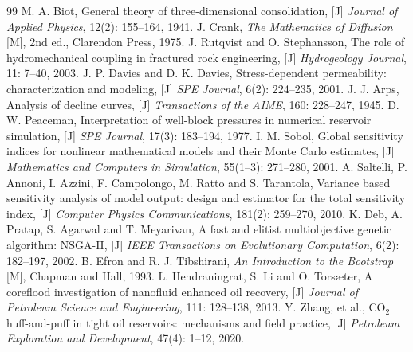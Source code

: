 \documentclass{swmcmthesis}
\begin{document}
\begin{thebibliography}{99}
 M. A. Biot, General theory of three-dimensional consolidation, [J] \emph{Journal of Applied Physics}, 12(2): 155--164, 1941.
 J. Crank, \emph{The Mathematics of Diffusion} [M], 2nd ed., Clarendon Press, 1975.
 J. Rutqvist and O. Stephansson, The role of hydromechanical coupling in fractured rock engineering, [J] \emph{Hydrogeology Journal}, 11: 7--40, 2003.
 J. P. Davies and D. K. Davies, Stress-dependent permeability: characterization and modeling, [J] \emph{SPE Journal}, 6(2): 224--235, 2001.
 J. J. Arps, Analysis of decline curves, [J] \emph{Transactions of the AIME}, 160: 228--247, 1945.
 D. W. Peaceman, Interpretation of well-block pressures in numerical reservoir simulation, [J] \emph{SPE Journal}, 17(3): 183--194, 1977.
 I. M. Sobol, Global sensitivity indices for nonlinear mathematical models and their Monte Carlo estimates, [J] \emph{Mathematics and Computers in Simulation}, 55(1--3): 271--280, 2001.
 A. Saltelli, P. Annoni, I. Azzini, F. Campolongo, M. Ratto and S. Tarantola, Variance based sensitivity analysis of model output: design and estimator for the total sensitivity index, [J] \emph{Computer Physics Communications}, 181(2): 259--270, 2010.
 K. Deb, A. Pratap, S. Agarwal and T. Meyarivan, A fast and elitist multiobjective genetic algorithm: NSGA-II, [J] \emph{IEEE Transactions on Evolutionary Computation}, 6(2): 182--197, 2002.
 B. Efron and R. J. Tibshirani, \emph{An Introduction to the Bootstrap} [M], Chapman and Hall, 1993.
 L. Hendraningrat, S. Li and O. Tors{\ae}ter, A coreflood investigation of nanofluid enhanced oil recovery, [J] \emph{Journal of Petroleum Science and Engineering}, 111: 128--138, 2013.
 Y. Zhang, et al., CO$_2$ huff-and-puff in tight oil reservoirs: mechanisms and field practice, [J] \emph{Petroleum Exploration and Development}, 47(4): 1--12, 2020.
\end{thebibliography}


\end{document}
